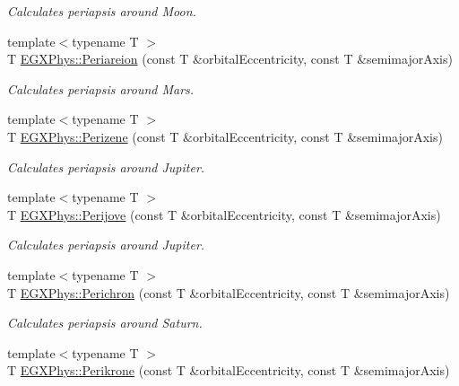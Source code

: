 \begin{DoxyCompactItemize}
\begin{DoxyCompactList}\small\item\em Calculates periapsis around Moon. \end{DoxyCompactList}\item 
{\footnotesize template$<$typename T $>$ }\\T \mbox{\hyperlink{group___e_g_x_phys-_periapsis_ga0617ba07a30b0fd0544c02f691bfae26}{E\+G\+X\+Phys\+::\+Periareion}} (const T \&orbital\+Eccentricity, const T \&semimajor\+Axis)
\begin{DoxyCompactList}\small\item\em Calculates periapsis around Mars. \end{DoxyCompactList}\item 
{\footnotesize template$<$typename T $>$ }\\T \mbox{\hyperlink{group___e_g_x_phys-_periapsis_ga0523c65b7fc26e675388b2c3d38aa00b}{E\+G\+X\+Phys\+::\+Perizene}} (const T \&orbital\+Eccentricity, const T \&semimajor\+Axis)
\begin{DoxyCompactList}\small\item\em Calculates periapsis around Jupiter. \end{DoxyCompactList}\item 
{\footnotesize template$<$typename T $>$ }\\T \mbox{\hyperlink{group___e_g_x_phys-_periapsis_ga075052f7ff9aa1d5fdf4501b493be86b}{E\+G\+X\+Phys\+::\+Perijove}} (const T \&orbital\+Eccentricity, const T \&semimajor\+Axis)
\begin{DoxyCompactList}\small\item\em Calculates periapsis around Jupiter. \end{DoxyCompactList}\item 
{\footnotesize template$<$typename T $>$ }\\T \mbox{\hyperlink{group___e_g_x_phys-_periapsis_ga12b5e99aa2e3e7031ef6ce93060cf516}{E\+G\+X\+Phys\+::\+Perichron}} (const T \&orbital\+Eccentricity, const T \&semimajor\+Axis)
\begin{DoxyCompactList}\small\item\em Calculates periapsis around Saturn. \end{DoxyCompactList}\item 
{\footnotesize template$<$typename T $>$ }\\T \mbox{\hyperlink{group___e_g_x_phys-_periapsis_gaa56f74c44a3583b8f0d13b821c1d7422}{E\+G\+X\+Phys\+::\+Perikrone}} (const T \&orbital\+Eccentricity, const T \&semimajor\+Axis)

\end{DoxyCompactItemize}
